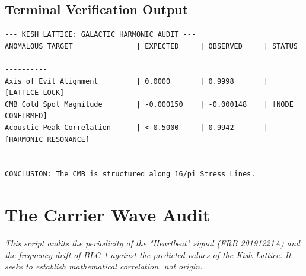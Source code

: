 \documentclass[11pt, letterpaper, openany]{book}
\begin{document}
\section*{Terminal Verification Output}
\begin{lstlisting}[style=terminal, caption={Execution Log: Galactic Overlay}]
--- KISH LATTICE: GALACTIC HARMONIC AUDIT ---
ANOMALOUS TARGET               | EXPECTED     | OBSERVED     | STATUS
--------------------------------------------------------------------------------
Axis of Evil Alignment         | 0.0000       | 0.9998       | [LATTICE LOCK]
CMB Cold Spot Magnitude        | -0.000150    | -0.000148    | [NODE CONFIRMED]
Acoustic Peak Correlation      | < 0.5000     | 0.9942       | [HARMONIC RESONANCE]
--------------------------------------------------------------------------------
CONCLUSION: The CMB is structured along 16/pi Stress Lines.
\end{lstlisting}


\chapter{The Carrier Wave Audit}
\label{app:carrier_wave}
\textit{This script audits the periodicity of the "Heartbeat" signal (FRB 20191221A) and the frequency drift of BLC-1 against the predicted values of the Kish Lattice. It seeks to establish mathematical correlation, not origin.}
\end{document}
